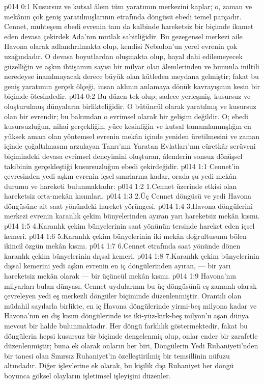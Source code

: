 \vs p014 0:1 Kusursuz ve kutsal âlem tüm yaratımın merkezini kaplar; o, zaman ve mekânın çok geniş yaratılmışlarının etrafında döngüsü ebedi temel parçadır. Cennet, muhteşem ebedi evrenin tam da kalbinde hareketsiz bir biçimde ikamet eden devasa çekirdek Ada’nın mutlak sabitliğidir. Bu gezegensel merkezi aile Havona olarak adlandırılmakta olup, kendisi Nebadon’un yerel evrenin çok uzağındadır. O devasa boyutlardan oluşmakta olup, hayal dahi edilemeyecek güzelliğin ve aşkın ihtişamın sayısı bir milyar olan âlemlerinden ve bununla iniltili neredeyse inanılmayacak derece büyük olan kütleden meydana gelmiştir; fakat bu geniş yaratımın gerçek ölçeği, insan aklının anlamaya dönük kavrayışının kesin bir biçimde ötesindedir.
\vs p014 0:2 Bu düzen tek olup; sadece yerleşmiş, kusursuz ve oluşturulmuş dünyaların birlikteliğidir. O bütüncül olarak yaratılmış ve kusursuz olan bir evrendir; bu bakımdan o evrimsel olarak bir gelişim değildir. O; ebedi kusursuzluğun, nihai gerçekliğin, yüce kesinliğin ve kutsal tamamlanmışlığın en yüksek amacı olan yöntemsel evrenin mekân içinde yeniden üretilmesini ve zaman içinde çoğaltılmasını arzulayan Tanrı’nın Yaratan Evlatları’nın cüretkâr serüveni biçimindeki devasa evrimsel deneyimini oluşturan, âlemlerin sonsuz dönüşsel takibinin gerçekleştiği kusursuzluğun ebedi çekirdeğidir.
\vs p014 1:1 Cennet’in çevresinden yedi aşkın evrenin içsel sınırlarına kadar, orada şu yedi mekân durumu ve hareketi bulunmaktadır:
\vs p014 1:2 1.\bibnobreakspace Cennet üzerinde etkisi olan hareketsiz orta\hyp{}mekân kısımları.
\vs p014 1:3 2.\bibnobreakspace Üç Cennet döngüsü ve yedi Havona döngüsüne ait saat yönündeki hareket yörüngesi.
\vs p014 1:4 3.\bibnobreakspace Havona döngülerini merkezi evrenin karanlık çekim bünyelerinden ayıran yarı hareketsiz mekân kısmı.
\vs p014 1:5 4.\bibnobreakspace Karanlık çekim bünyelerinin saat yönünün tersinde hareket eden içsel kemeri.
\vs p014 1:6 5.\bibnobreakspace Karanlık çekim bünyelerinin iki mekân doğrultusunu bölen ikincil özgün mekân kısmı.
\vs p014 1:7 6.\bibnobreakspace Cennet etrafında saat yönünde dönen karanlık çekim bünyelerinin dışsal kemeri.
\vs p014 1:8 7.\bibnobreakspace Karanlık çekim bünyelerinin dışsal kemerini yedi aşkın evrenin en iç döngülerinden ayıran, --- bir yarı hareketsiz mekân olarak --- bir üçüncül mekân kısmı.
\vs p014 1:9 Havona’nın milyarları bulan dünyası, Cennet uydularının bu üç döngüsünü eş zamanlı olarak çevreleyen yedi eş merkezli döngüler biçiminde düzenlenmiştir. Orantılı olan müdahil sayılarla birlikte, en iç Havona döngülerinde yirmi\hyp{}beş milyona kadar ve Havona’nın en dış kısım döngülerinde ise iki\hyp{}yüz\hyp{}kırk\hyp{}beş milyon’u aşan dünya mevcut bir halde bulunmaktadır. Her döngü farklılık göstermektedir, fakat bu döngülerin hepsi kusursuz bir biçimde dengelenmiş olup, onlar ender bir zarafetle düzenlenmiştir; buna ek olarak onların her biri, Döngülerin Yedi Ruhaniyeti’nden bir tanesi olan Sınırsız Ruhaniyet’in özelleştirilmiş bir temsillinin nüfuzu altındadır. Diğer işlevlerine ek olarak, bu kişilik dışı Ruhaniyet her döngü boyunca göksel olayların işletimsel işleyişini düzenler.
